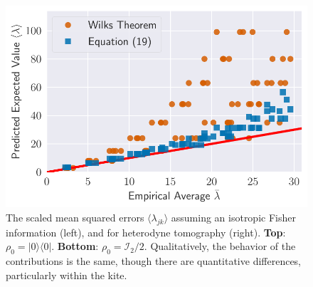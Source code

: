 \documentclass[aps,pra, twocolumn]{revtex4}
\begin{document}
\begin{figure}[h]
  \includegraphics[width=\columnwidth]{Images/Figure_11.pdf}
 \caption{The scaled mean squared errors $\langle \lambda_{jk} \rangle$ assuming an isotropic Fisher information (left), and for heterodyne tomography (right). \textbf{Top}: $\rho_{0} = |0\rangle\langle 0|$. \textbf{Bottom}: $\rho_{0} = \mathcal{I}_{2}/2$. Qualitatively, the behavior of the contributions is the same, though there are quantitative differences, particularly within the
kite.}
\label{fig:model_comparison}
\end{figure}
\end{document}
